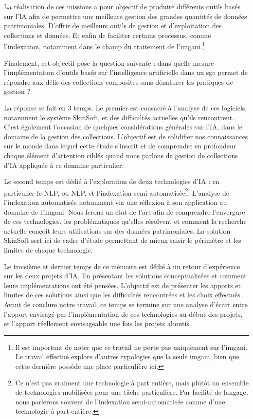 La réalisation de ces missions a pour objectif de produire différents outils basés sur l'\gls{IA} afin de permettre une meilleure gestion des grandes quantités de données patrimoniales. D'offrir de meilleurs outils de gestion et d'exploitation des collections et données. Et enfin de faciliter certains processus, comme l'indexation, notamment dans le champ du traitement de l'\gls{imgani}.\footnote{Il est important de noter que ce travail ne porte pas uniquement sur l'\gls{imgani}. Le travail effectué explore d'autres typologies que la seule \gls{imgani}, bien que cette dernière possède une place particulière ici.}\newline
		
Finalement, cet objectif pose la question suivante : dans quelle mesure l’implémentation d'outils basés sur l’intelligence artificielle dans un \gls{sgc} permet de répondre aux défis des collections composites sans dénaturer les pratiques de gestion ?\newline
		
La réponse se fait en 3 temps. Le premier est consacré à l'analyse de ces logiciels, notamment le système SkinSoft, et des difficultés actuelles qu'ils rencontrent. C'est également l'occasion de quelques considérations générales sur l'\gls{IA}, dans le domaine de la gestion des collections. L'objectif est de solidifier nos connaissances sur le monde dans lequel cette étude s'inscrit et de comprendre en profondeur chaque élément d'attention ciblés quand nous parlons de gestion de collections d'\gls{IA} appliquée à ce domaine particulier. 
		
Le second temps est dédié à l'exploration de deux technologies d'\gls{IA} : en particulier le \gls{NLP}, ou NLP, et l'indexation semi-automatisée\footnote{Ce n'est pas vraiment une technologie à part entière, mais plutôt un ensemble de technologies mobilisées pour une tâche particulière. Par facilité de langage, nous parlerons souvent de l'indexation semi-automatisée comme d'une technologie à part entière.}. L'analyse de l'indexation automatisée notamment via une réflexion à son application au domaine de l'\gls{imgani}. Nous ferons un état de l'art afin de comprendre l'envergure de ces technologies, les problématiques qu'elles résolvent et comment la recherche actuelle conçoit leurs utilisations sur des données patrimoniales. La solution SkinSoft sert ici de cadre d'étude permettant de mieux saisir le périmètre et les limites de chaque technologie. 
		
Le troisième et dernier temps de ce mémoire est dédié à un retour d'expérience sur les deux projets d'\gls{IA}. En présentant les solutions conceptualisées et comment leurs implémentations ont été pensées. L'objectif est de présenter les apports et limites de ces solutions ainsi que les difficultés rencontrées et les choix effectués. Avant de conclure notre travail, ce temps se termine sur une analyse d'écart entre l'apport envisagé par l'implémentation de ces technologies au début des projets, et l'apport réellement envisageable une fois les projets aboutis. 
